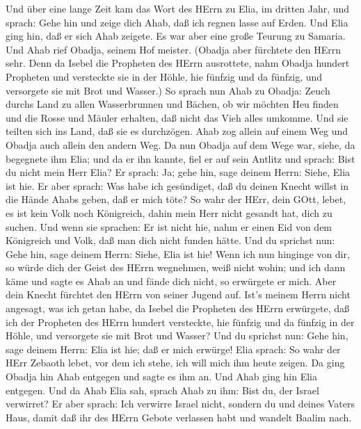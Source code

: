  Und über eine lange Zeit kam das Wort des HErrn zu Elia, im
dritten Jahr, und sprach: Gehe hin und zeige dich Ahab, daß ich regnen
lasse auf Erden.  Und Elia ging hin, daß er sich Ahab
zeigete. Es war aber eine große Teurung zu Samaria.  Und
Ahab rief Obadja, seinem Hof meister. (Obadja aber fürchtete den HErrn
sehr.  Denn da Isebel die Propheten des HErrn ausrottete,
nahm Obadja hundert Propheten und versteckte sie in der Höhle, hie
fünfzig und da fünfzig, und versorgete sie mit Brot und Wasser.)
 So sprach nun Ahab zu Obadja: Zeuch durchs Land zu allen
Wasserbrunnen und Bächen, ob wir möchten Heu finden und die Rosse und
Mäuler erhalten, daß nicht das Vieh alles umkomme.  Und sie
teilten sich ins Land, daß sie es durchzögen. Ahab zog allein auf einem
Weg und Obadja auch allein den andern Weg.  Da nun Obadja
auf dem Wege war, siehe, da begegnete ihm Elia; und da er ihn kannte,
fiel er auf sein Antlitz und sprach: Bist du nicht mein Herr Elia?
 Er sprach: Ja; gehe hin, sage deinem Herrn: Siehe, Elia ist
hie.  Er aber sprach: Was habe ich gesündiget, daß du deinen
Knecht willst in die Hände Ahabs geben, daß er mich töte? 
So wahr der HErr, dein GOtt, lebet, es ist kein Volk noch Königreich,
dahin mein Herr nicht gesandt hat, dich zu suchen. Und wenn sie
sprachen: Er ist nicht hie, nahm er einen Eid von dem Königreich und
Volk, daß man dich nicht funden hätte.  Und du sprichst
nun: Gehe hin, sage deinem Herrn: Siehe, Elia ist hie! 
Wenn ich nun hinginge von dir, so würde dich der Geist des HErrn
wegnehmen, weiß nicht wohin; und ich dann käme und sagte es Ahab an und
fände dich nicht, so erwürgete er mich. Aber dein Knecht fürchtet den
HErrn von seiner Jugend auf.  Ist's meinem Herrn nicht
angesagt, was ich getan habe, da Isebel die Propheten des HErrn
erwürgete, daß ich der Propheten des HErrn hundert versteckte, hie
fünfzig und da fünfzig in der Höhle, und versorgete sie mit Brot und
Wasser?  Und du sprichst nun: Gehe hin, sage deinem Herrn:
Elia ist hie; daß er mich erwürge!  Elia sprach: So wahr
der HErr Zebaoth lebet, vor dem ich stehe, ich will mich ihm heute
zeigen.  Da ging Obadja hin Ahab entgegen und sagte es ihm
an. Und Ahab ging hin Elia entgegen.  Und da Ahab Elia sah,
sprach Ahab zu ihm: Bist du, der Israel verwirret?  Er aber
sprach: Ich verwirre Israel nicht, sondern du und deines Vaters Haus,
damit daß ihr des HErrn Gebote verlassen habt und wandelt Baalim nach.

